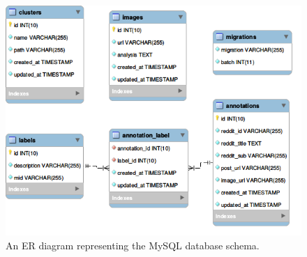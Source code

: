 \documentclass[msc,oneside]{ubcthesis}%
\begin{document}
\begin{figure}[!htb]
\includegraphics[width=\textwidth]{mysql_er_April_2.png}
\caption[MySQL Database schema]{
An ER diagram representing the MySQL database schema.}
\end{figure}
\end{document}

